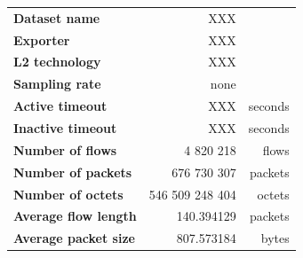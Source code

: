\begin{tabular}{@{}lrr@{}}
\toprule
\textbf{Dataset name} & XXX & \\
\textbf{Exporter} & XXX & \\
\textbf{L2 technology} & XXX & \\
\textbf{Sampling rate} & none & \\
\textbf{Active timeout} & XXX & seconds \\
\textbf{Inactive timeout} & XXX & seconds \\
\midrule
\textbf{Number of flows} & 4 820 218 & flows \\
\textbf{Number of packets} & 676 730 307 & packets \\
\textbf{Number of octets} & 546 509 248 404 & octets \\
\textbf{Average flow length} & 140.394129 & packets \\
\textbf{Average packet size} & 807.573184 & bytes \\
\bottomrule
\end{tabular}


